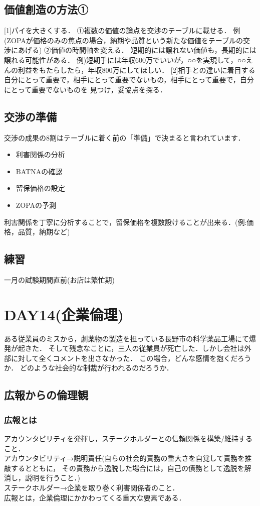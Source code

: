 \documentclass[a4paper,11pt]{ltjsarticle}
\begin{document}
\subsection{価値創造の方法①}
[1]パイを大きくする．
①複数の価値の論点を交渉のテーブルに載せる．
例(ZOPAが価格のみの焦点の場合，納期や品質という新たな価値をテーブルの交渉にあげる)
②価値の時間軸を変える．
短期的には譲れない価値も，長期的には譲れる可能性がある．
例)短期手には年収600万でいいが，○○を実現して，○○えんの利益をもたらしたら，年収800万にしてほしい．
[2]相手との違いに着目する
自分にとって重要で，相手にとって重要でないもの，相手にとって重要で，自分にとって重要でないものを
見つけ，妥協点を探る．
\subsection{交渉の準備}
交渉の成果の8割はテーブルに着く前の「準備」で決まると言われています．
\begin{itemize}
  \item 利害関係の分析
  \item BATNAの確認
  \item 留保価格の設定
  \item ZOPAの予測
\end{itemize}
利害関係を丁寧に分析することで，留保価格を複数設けることが出来る．(例:価格，品質，納期など)
\subsection{練習}
一月の試験期間直前(お店は繁忙期)
\section{DAY14(企業倫理)}
ある従業員のミスから，劇薬物の製造を担っている長野市の科学薬品工場にて爆発が起きた．
そして残念なことに，三人の従業員が死亡した．しかし会社は外部に対して全くコメントを出さなかった．
この場合，どんな感情を抱くだろうか．
どのような社会的な制裁が行われるのだろうか．
\subsection{広報からの倫理観}
\subsubsection{広報とは}
アカウンタビリティを発揮し，ステークホルダーとの信頼関係を構築/維持すること．\\
アカウンタビリティ→説明責任(自らの社会的責務の重大さを自覚して責務を推敲するとともに，
その責務から逸脱した場合には，自己の債務として逸脱を解消し，説明を行うこと．)\\
ステークホルダー→企業を取り巻く利害関係者のこと．\\
広報とは，企業倫理にかかわってくる重大な要素である．
\end{document}
